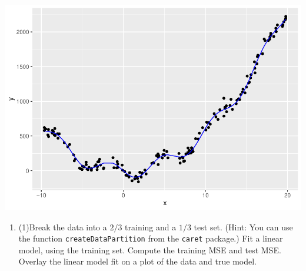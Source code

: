 \documentclass[
]{article}
\newenvironment{Shaded}{\begin{snugshade}}{\end{snugshade}}
\newcommand{\CommentTok}[1]{\textcolor[rgb]{0.56,0.35,0.01}{\textit{#1}}}
\newcommand{\DataTypeTok}[1]{\textcolor[rgb]{0.13,0.29,0.53}{#1}}
\newcommand{\DecValTok}[1]{\textcolor[rgb]{0.00,0.00,0.81}{#1}}
\newcommand{\KeywordTok}[1]{\textcolor[rgb]{0.13,0.29,0.53}{\textbf{#1}}}
\newcommand{\NormalTok}[1]{#1}
\newcommand{\OperatorTok}[1]{\textcolor[rgb]{0.81,0.36,0.00}{\textbf{#1}}}
\newcommand{\StringTok}[1]{\textcolor[rgb]{0.31,0.60,0.02}{#1}}
\providecommand{\tightlist}{%
  \setlength{\itemsep}{0pt}\setlength{\parskip}{0pt}}
\begin{document}
\begin{Shaded}
\end{Shaded}

\includegraphics{assignment1_files/figure-latex/unnamed-chunk-2-1.pdf}

\begin{enumerate}
\def\labelenumi{\alph{enumi}.}
\setcounter{enumi}{1}
\tightlist
\item
  (1)Break the data into a \(2/3\) training and a \(1/3\) test set.
  (Hint: You can use the function \texttt{createDataPartition} from the
  \texttt{caret} package.) Fit a linear model, using the training set.
  Compute the training MSE and test MSE. Overlay the linear model fit on
  a plot of the data and true model.
\end{enumerate}
\end{document}
